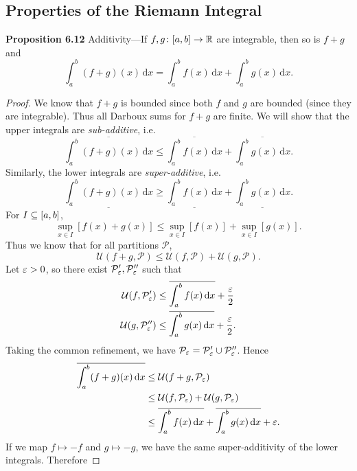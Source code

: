 \documentclass[class=article, crop=false]{standalone}
\begin{document}
  \subsection{Properties of the Riemann Integral}
  \textbf{Proposition 6.12} Additivity---If $f, g\colon [a, b]\to \mathbb{R}$ are integrable, then so is $f + g$ and
  \[
    \int_{a}^{b}(f + g)(x) \,\mathrm dx = \int_{a}^{b}f(x) \,\mathrm dx + \int_{a}^{b}g(x) \,\mathrm dx.
  \]
  \begin{proof}
    We know that $f + g$ is bounded since both $f$ and $g$ are bounded (since they are integrable). Thus all Darboux sums for $f + g$ are finite. We will show that the upper integrals are \emph{sub-additive}, i.e.
    \[
      \overline{\int_{a}^{b}(f + g)(x) \,\mathrm dx}\leq \overline{\int_{a}^{b}f(x) \,\mathrm dx} + \overline{\int_{a}^{b}g(x) \,\mathrm dx}.
    \]
    Similarly, the lower integrals are \emph{super-additive}, i.e.
    \[
      \underline{\int_{a}^{b}(f + g)(x) \,\mathrm dx}\geq \underline{\int_{a}^{b}f(x) \,\mathrm dx} + \underline{\int_{a}^{b}g(x) \,\mathrm dx}.
    \]
    For $I\subseteq [a, b]$,
    \[
      \sup_{x\in I} [f(x) + g(x)]\leq \sup_{x\in I} [f(x)] + \sup_{x\in I} [g(x)].
    \]
    Thus we know that for all partitions $\mathcal{P}$,
    \[
      \mathcal{U}(f + g, \mathcal{P})\leq \mathcal{U}(f, \mathcal{P}) + \mathcal{U}(g, \mathcal{P}).
    \]
    Let $\varepsilon > 0$, so there exist $\mathcal{P}_{\varepsilon}', \mathcal{P}_{\varepsilon}''$ such that
    \begin{align*}
      \mathcal{U}(f, \mathcal{P}_{\varepsilon}')&\leq \overline{\int_{a}^{b}f(x) \,\mathrm dx} + \frac{\varepsilon}{2} \\
      \mathcal{U}(g, \mathcal{P}_{\varepsilon}'')&\leq \overline{\int_{a}^{b}g(x) \,\mathrm dx} + \frac{\varepsilon}{2}.
    \end{align*}
    Taking the common refinement, we have $\mathcal{P}_{\varepsilon} = \mathcal{P}_{\varepsilon}'\cup \mathcal{P}_{\varepsilon}''$. Hence
    \begin{align*}
      \overline{\int_{a}^{b}(f + g)(x) \,\mathrm dx} &\leq \mathcal{U}(f + g, \mathcal{P}_{\varepsilon}) \\
                                                     &\leq \mathcal{U}(f, \mathcal{P}_{\varepsilon}) + \mathcal{U}(g, \mathcal{P}_{\varepsilon}) \\
                                                     &\leq \overline{\int_{a}^{b}f(x) \,\mathrm dx} + \overline{\int_{a}^{b}g(x) \,\mathrm dx} + \varepsilon.
    \end{align*}
    If we map $f\mapsto -f$ and $g\mapsto -g$, we have the same super-additivity of the lower integrals. Therefore

\end{proof}
\end{document}
